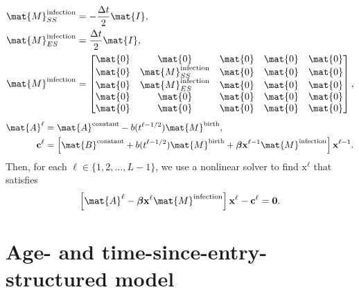 \documentclass{jpmarticle}
\renewcommand{\vec}[1]{\boldsymbol{\mathrm{#1}}}
\begin{document}
\begin{equation}
  \begin{split}
    \mat{M}_{SS}^{\text{infection}} &=
    - \frac{\Delta t}{2} \mat{I},
    \\
    \mat{M}_{ES}^{\text{infection}} &=
    \frac{\Delta t}{2} \mat{I},
    \\
    \mat{M}^{\text{infection}} &=
    \begin{bmatrix}
      \mat{0} & \mat{0} & \mat{0} & \mat{0} & \mat{0}
      \\
      \mat{0} & \mat{M}_{SS}^{\text{infection}} & \mat{0} & \mat{0} & \mat{0}
      \\
      \mat{0} & \mat{M}_{ES}^{\text{infection}} & \mat{0} & \mat{0} & \mat{0}
      \\
      \mat{0} & \mat{0} & \mat{0} & \mat{0} & \mat{0}
      \\
      \mat{0} & \mat{0} & \mat{0} & \mat{0} & \mat{0}
    \end{bmatrix},
  \end{split}
\end{equation}
\begin{equation}
  \begin{split}
    \mat{A}^{\ell} &=
    \mat{A}^{\text{constant}}
    - b(t^{\ell - 1 / 2}) \mat{M}^{\text{birth}},
    \\
    \vec{c}^{\ell} &=
    \left[
      \mat{B}^{\text{constant}}
      + b(t^{\ell - 1 / 2}) \mat{M}^{\text{birth}}
      + \vec{\beta} \vec{x}^{\ell - 1} \mat{M}^{\text{infection}}
    \right] \vec{x}^{\ell - 1}.
  \end{split}
\end{equation}
Then, for each $\ell \in \{1, 2, \ldots, L - 1\}$,
we use a nonlinear solver to find $\vec{x}^{\ell}$ that satisfies
\begin{equation}
  \left[
    \mat{A}^{\ell}
    - \vec{\beta} \vec{x}^{\ell} \mat{M}^{\text{infection}}
  \right] \vec{x}^{\ell}
  - \vec{c}^{\ell}
  = \vec{0}.
\end{equation}


\section{Age- and time-since-entry-structured model}
\end{document}
